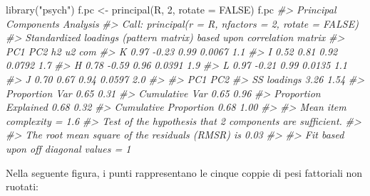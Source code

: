 \documentclass[
  11pt,
]{krantz}
\makeatletter
\newenvironment{Shaded}{\begin{snugshade}}{\end{snugshade}}
\newcommand{\AttributeTok}[1]{\textcolor[rgb]{0.61,0.61,0.61}{#1}}
\newcommand{\CommentTok}[1]{\textcolor[rgb]{0.37,0.37,0.37}{\textit{#1}}}
\newcommand{\ConstantTok}[1]{\textcolor[rgb]{0,0,0}{#1}}
\newcommand{\DecValTok}[1]{\textcolor[rgb]{0.06,0.06,0.06}{#1}}
\newcommand{\FunctionTok}[1]{\textcolor[rgb]{0,0,0}{#1}}
\newcommand{\NormalTok}[1]{#1}
\newcommand{\OtherTok}[1]{\textcolor[rgb]{0.37,0.37,0.37}{#1}}
\newcommand{\SpecialCharTok}[1]{\textcolor[rgb]{0,0,0}{#1}}
\newcommand{\StringTok}[1]{\textcolor[rgb]{0.5,0.5,0.5}{#1}}
\newenvironment{kframe}{%
\medskip{}
\setlength{\fboxsep}{.8em}
 \def\at@end@of@kframe{}%
 \ifinner\ifhmode%
  \def\at@end@of@kframe{\end{minipage}}%
  \begin{minipage}{\columnwidth}%
 \fi\fi%
 \def\FrameCommand##1{\hskip\@totalleftmargin \hskip-\fboxsep
 \colorbox{shadecolor}{##1}\hskip-\fboxsep
     \hskip-\linewidth \hskip-\@totalleftmargin \hskip\columnwidth}%
 \MakeFramed {\advance\hsize-\width
   \@totalleftmargin\z@ \linewidth\hsize
   \@setminipage}}%
 {\par\unskip\endMakeFramed%
 \at@end@of@kframe}
\renewenvironment{Shaded}{\begin{kframe}}{\end{kframe}}
\theoremstyle{definition}
\theoremstyle{definition}
\theoremstyle{definition}
\theoremstyle{definition}
\theoremstyle{remark}
\makeatother
\begin{document}
\begin{Shaded}
\begin{Highlighting}[]
\FunctionTok{library}\NormalTok{(}\StringTok{"psych"}\NormalTok{)}
\NormalTok{f.pc }\OtherTok{\textless{}{-}} \FunctionTok{principal}\NormalTok{(R, }\DecValTok{2}\NormalTok{, }\AttributeTok{rotate =} \ConstantTok{FALSE}\NormalTok{)}
\NormalTok{f.pc}
\CommentTok{\#\textgreater{} Principal Components Analysis}
\CommentTok{\#\textgreater{} Call: principal(r = R, nfactors = 2, rotate = FALSE)}
\CommentTok{\#\textgreater{} Standardized loadings (pattern matrix) based upon correlation matrix}
\CommentTok{\#\textgreater{}    PC1   PC2   h2     u2 com}
\CommentTok{\#\textgreater{} K 0.97 {-}0.23 0.99 0.0067 1.1}
\CommentTok{\#\textgreater{} I 0.52  0.81 0.92 0.0792 1.7}
\CommentTok{\#\textgreater{} H 0.78 {-}0.59 0.96 0.0391 1.9}
\CommentTok{\#\textgreater{} L 0.97 {-}0.21 0.99 0.0135 1.1}
\CommentTok{\#\textgreater{} J 0.70  0.67 0.94 0.0597 2.0}
\CommentTok{\#\textgreater{} }
\CommentTok{\#\textgreater{}                        PC1  PC2}
\CommentTok{\#\textgreater{} SS loadings           3.26 1.54}
\CommentTok{\#\textgreater{} Proportion Var        0.65 0.31}
\CommentTok{\#\textgreater{} Cumulative Var        0.65 0.96}
\CommentTok{\#\textgreater{} Proportion Explained  0.68 0.32}
\CommentTok{\#\textgreater{} Cumulative Proportion 0.68 1.00}
\CommentTok{\#\textgreater{} }
\CommentTok{\#\textgreater{} Mean item complexity =  1.6}
\CommentTok{\#\textgreater{} Test of the hypothesis that 2 components are sufficient.}
\CommentTok{\#\textgreater{} }
\CommentTok{\#\textgreater{} The root mean square of the residuals (RMSR) is  0.03 }
\CommentTok{\#\textgreater{} }
\CommentTok{\#\textgreater{} Fit based upon off diagonal values = 1}
\end{Highlighting}
\end{Shaded}

Nella seguente figura, i punti rappresentano le cinque coppie di pesi fattoriali non ruotati:

\begin{Shaded}
\end{Shaded}
\end{document}
